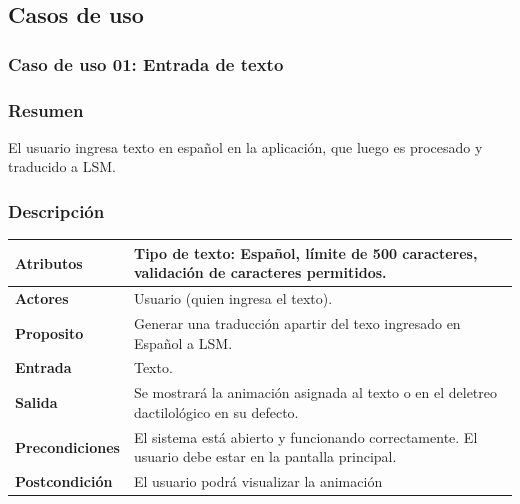 \subsection{Casos de uso}
\subsubsection{Caso de uso 01: Entrada de texto}
\subsubsection{Resumen}
El usuario ingresa texto en español en la aplicación, que luego es procesado y traducido a LSM.
\subsubsection{Descripción}

\noindent
\begin{tabularx}{\textwidth}{|l|X|}
\hline
\textbf{Atributos} & Tipo de texto: Español, límite de 500 caracteres, validación de caracteres permitidos. \\ \hline
\textbf{Actores} & Usuario (quien ingresa el texto). \\ \hline
\textbf{Proposito} & Generar una traducción apartir del texo ingresado en Español a LSM. \\ \hline
\textbf{Entrada} & Texto. \\ \hline
\textbf{Salida} & Se mostrará la animación asignada al texto o en el deletreo dactilológico en su defecto. \\ \hline
\textbf{Precondiciones} & El sistema está abierto y funcionando correctamente. El usuario debe estar en la pantalla principal. \\ \hline
\textbf{Postcondición} & El usuario podrá visualizar la animación \\ \hline
\end{tabularx}

    


